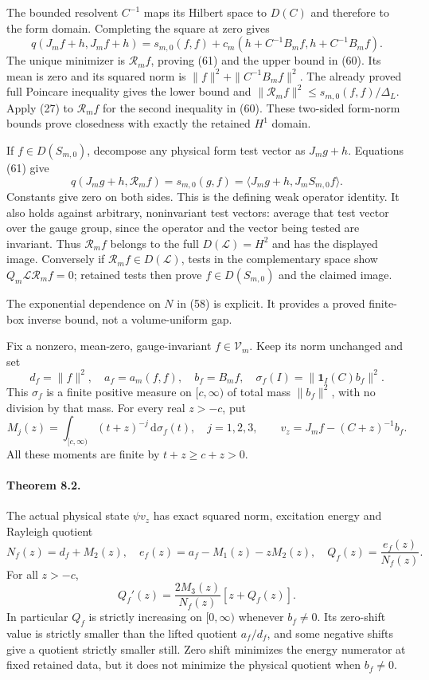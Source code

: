 \documentclass[11pt]{article}
\newcommand{\dd}{\,\mathrm d}
\newcommand{\LL}{\mathscr L}
\newcommand{\VV}{\mathscr V}
\begin{document}
The bounded resolvent $C^{-1}$ maps its Hilbert space to $D(C)$ and
therefore to the form domain. Completing the square at zero gives
\[
 q(J_mf+h,J_mf+h)
 =s_{m,0}(f,f)+c_m(h+C^{-1}B_mf,h+C^{-1}B_mf).
\]
The unique minimizer is $\mathcal R_m f$, proving
(61) and the upper bound in
(60). Its mean is zero and its squared norm is
$\|f\|^2+\|C^{-1}B_mf\|^2$. The already proved full Poincare inequality
gives the lower bound and
$\|\mathcal R_m f\|^2\leq s_{m,0}(f,f)/\Delta_L$.
Apply (27) to $\mathcal R_m f$ for the second
inequality in (60). These two-sided form-norm
bounds prove closedness with exactly the retained $H^1$ domain.

If $f\in D(S_{m,0})$, decompose any physical form test vector as
$J_mg+h$. Equations (61) give
\[
 q(J_mg+h,\mathcal R_m f)=s_{m,0}(g,f)
                       =\langle J_mg+h,J_mS_{m,0}f\rangle .
\]
Constants give zero on both sides. This is the defining weak operator
identity. It also holds against arbitrary, noninvariant test vectors:
average that test vector over the gauge group, since the operator and
the vector being tested are invariant. Thus $\mathcal R_m f$ belongs
to the full $D(\LL)=H^2$ and has the displayed image.
Conversely if $\mathcal R_m f\in D(\LL)$, tests in the complementary
space show $Q_m\LL\mathcal R_m f=0$; retained tests then prove
$f\in D(S_{m,0})$ and the claimed image.



The exponential dependence on $N$ in (58) is explicit.
It provides a proved finite-box inverse bound, not a volume-uniform gap.

Fix a nonzero, mean-zero, gauge-invariant $f\in\VV_m$. Keep its norm
unchanged and set
\[
 d_f=\|f\|^2,\quad a_f=a_m(f,f),\quad b_f=B_mf,\quad
 \sigma_f(I)=\|\mathbf1_I(C)b_f\|^2 .
\]
This $\sigma_f$ is a finite positive measure on $[c,\infty)$ of total
mass $\|b_f\|^2$, with no division by that mass. For every real $z>-c$,
put
\begin{equation}\label{eq:inversemoments}
 M_j(z)=\int_{[c,\infty)}(t+z)^{-j}\dd\sigma_f(t),\quad j=1,2,3,
 \qquad v_z=J_mf-(C+z)^{-1}b_f .
\end{equation}
All these moments are finite by $t+z\geq c+z>0$.

\paragraph{Theorem 8.2.}
The actual physical state $\psi v_z$ has exact squared norm, excitation
energy and Rayleigh quotient
\begin{equation}\label{eq:affinemoments}
 N_f(z)=d_f+M_2(z),\quad
 e_f(z)=a_f-M_1(z)-zM_2(z),\quad
 Q_f(z)=\frac{e_f(z)}{N_f(z)}.
\end{equation}
For all $z>-c$,
\begin{equation}\label{eq:rayleighderivative}
 Q_f'(z)=\frac{2M_3(z)}{N_f(z)}[z+Q_f(z)].
\end{equation}
In particular $Q_f$ is strictly increasing on $[0,\infty)$ whenever
$b_f\ne0$. Its zero-shift value is strictly smaller than the lifted
quotient $a_f/d_f$, and some negative shifts give a quotient strictly
smaller still. Zero shift minimizes the energy numerator at fixed
retained data, but it does not minimize the physical quotient when
$b_f\ne0$.
\end{document}
